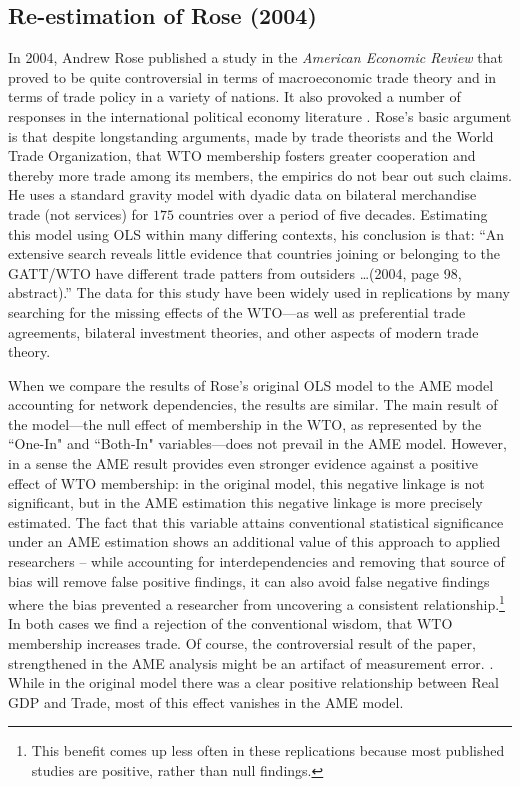\subsection{Re-estimation of Rose (2004)}

\nocite{rose:2004}
In 2004, Andrew Rose published a study in the \textit{American Economic Review} that proved to be quite controversial in terms of macroeconomic trade theory and in terms of trade policy in a variety of nations. It also provoked a number of responses in the international political economy literature \citep{tomz:etal:2007}.  Rose's basic argument is that despite longstanding arguments, made by trade theorists and the World Trade Organization, that WTO membership fosters greater cooperation and thereby more trade among its members, the empirics do not bear out such claims. He uses a standard gravity model with dyadic data on bilateral merchandise trade (not services) for $175$ countries over a period of five decades. Estimating this model using OLS within many differing contexts, his conclusion is that: ``An extensive search reveals little evidence that countries joining or belonging to the GATT/WTO have different trade patters from outsiders \ldots (2004, page 98, abstract).''  The data for this study have been widely used in replications by many searching for the missing effects of the WTO---as well as preferential trade agreements, bilateral investment theories, and other aspects of modern trade theory.  

When we compare the results of Rose's original OLS model to the AME model accounting for network dependencies, the results are similar. The main result of the model---the null effect of membership in the WTO, as represented by the ``One-In" and ``Both-In" variables---does not prevail in the AME model. However, in a sense the AME result provides even stronger evidence against a positive effect of WTO membership: in the original model, this negative linkage is not significant, but in the AME estimation this negative linkage is more precisely estimated. The fact that this variable attains conventional statistical significance under an AME estimation shows an additional value of this approach to applied researchers -- while accounting for interdependencies and removing that source of bias will remove false positive findings, it can also avoid false negative findings where the bias prevented a researcher from uncovering a consistent relationship.\footnote{This benefit comes up less often in these replications because most published studies are positive, rather than null findings.} In both cases we find  a rejection of the conventional wisdom, that WTO membership increases trade. Of course, the controversial result of the paper, strengthened in the AME analysis might be an artifact of measurement error. \citep{tomz:etal:2007}. While in the original model there was a clear positive relationship between Real GDP and Trade, most of this effect vanishes in the AME model. 

